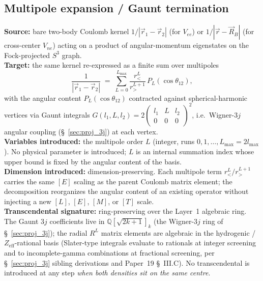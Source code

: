 \documentclass[11pt]{article}
\begin{document}
\subsection{Multipole expansion / Gaunt termination}
\label{sec:proj_multipole_gaunt}
\textbf{Source:} bare two-body Coulomb kernel $1/|\vec{r}_1 - \vec{r}_2|$
(for $V_{ee}$) or $1/|\vec{r} - \vec{R}_B|$ (for cross-center $V_{ne}$)
acting on a product of angular-momentum eigenstates on the Fock-projected
$S^3$ graph.\\
\textbf{Target:} the same kernel re-expressed as a finite sum over
multipoles
\begin{equation*}
  \frac{1}{|\vec{r}_1 - \vec{r}_2|}
  \;=\; \sum_{L=0}^{L_\text{max}}
        \frac{r_<^L}{r_>^{L+1}}\, P_L(\cos\theta_{12}),
\end{equation*}
with the angular content $P_L(\cos\theta_{12})$ contracted against
spherical-harmonic vertices via Gaunt integrals
$G(l_1, L, l_2) = 2 \begin{pmatrix} l_1 & L & l_2 \\ 0 & 0 & 0
\end{pmatrix}^{\!2}$, i.e.\ Wigner-$3j$ angular coupling
(\S~\ref{sec:proj_3j}) at each vertex.\\
\textbf{Variables introduced:} the multipole order $L$ (integer, runs
$0, 1, \dots, L_\text{max} = 2 l_\text{max}$).  No physical parameter
is introduced; $L$ is an internal summation index whose upper bound is
fixed by the angular content of the basis.\\
\textbf{Dimension introduced:} dimension-preserving.  Each multipole
term $r_<^L / r_>^{L+1}$ carries the same $[E]$ scaling as the parent
Coulomb matrix element; the decomposition reorganizes the angular
content of an existing operator without injecting a new $[L]$, $[E]$,
$[M]$, or $[T]$ scale.\\
\textbf{Transcendental signature:} ring-preserving over the Layer~1
algebraic ring.  The Gaunt $3j$ coefficients live in
$\mathbb{Q}[\sqrt{2k{+}1}]_k$ (the Wigner-$3j$ ring of
\S~\ref{sec:proj_3j}); the radial $R^L$ matrix elements are algebraic
in the hydrogenic / $Z_\text{eff}$-rational basis (Slater-type
integrals evaluate to rationals at integer screening and to
incomplete-gamma combinations at fractional screening, per
\S~\ref{sec:proj_3j} sibling derivations and Paper~19 \S~III.C).  No
transcendental is introduced at any step \emph{when both densities sit
on the same centre}.
\end{document}

